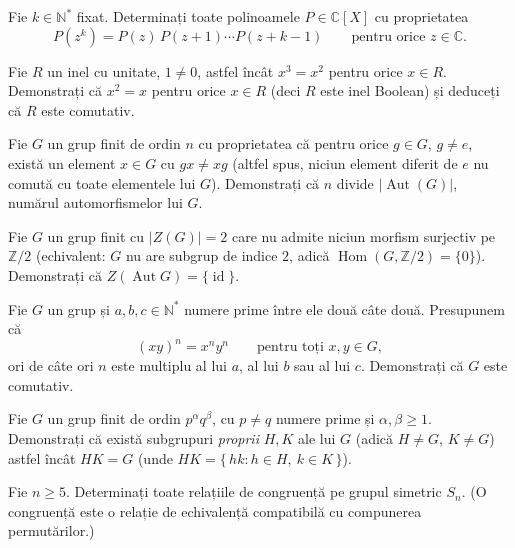 \begin{problema}
Fie $k \in \mathbb{N}^{*}$ fixat. Determinați toate polinoamele
$P \in \mathbb{C}[X]$ cu proprietatea
\[
  P(z^{k}) = P(z)\,P(z+1)\cdots P(z+k-1) \qquad \text{pentru orice } z \in \mathbb{C}.
\]
\end{problema}

\begin{problema}
Fie $R$ un inel cu unitate, $1\neq 0$, astfel încât $x^{3}=x^{2}$
pentru orice $x\in R$. Demonstrați că $x^{2}=x$ pentru orice
$x\in R$ (deci $R$ este inel Boolean) și deduceți că $R$ este
comutativ.
\end{problema}

\begin{problema}
Fie $G$ un grup finit de ordin $n$ cu proprietatea că pentru orice
$g\in G$, $g\neq e$, există un element $x\in G$ cu $gx\neq xg$ (altfel
spus, niciun element diferit de $e$ nu comută cu toate elementele lui
$G$). Demonstrați că $n$ divide $|\operatorname{Aut}(G)|$,
numărul automorfismelor lui $G$.
\end{problema}

\begin{problema}
Fie $G$ un grup finit cu $|Z(G)|=2$ care nu admite niciun morfism surjectiv
pe $\mathbb{Z}/2$ (echivalent: $G$ nu are subgrup de indice $2$, adică
$\operatorname{Hom}(G,\mathbb{Z}/2)=\{0\}$). Demonstrați că
$Z(\operatorname{Aut}G)=\{\operatorname{id}\}$.
\end{problema}

\begin{problema}
Fie $G$ un grup și $a,b,c\in\mathbb{N}^{*}$ numere prime între ele
două câte două. Presupunem că
\[
  (xy)^{n}=x^{n}y^{n}\qquad\text{pentru toți } x,y\in G,
\]
ori de câte ori $n$ este multiplu al lui $a$, al lui $b$ sau al lui $c$.
Demonstrați că $G$ este comutativ.
\end{problema}

\begin{problema}
Fie $G$ un grup finit de ordin $p^{\alpha}q^{\beta}$, cu $p\neq q$ numere
prime și $\alpha,\beta\ge 1$. Demonstrați că există
subgrupuri \emph{proprii} $H,K$ ale lui $G$ (adică $H\neq G$, $K\neq G$) astfel încât $HK=G$ (unde
$HK=\{\,hk : h\in H,\ k\in K\,\}$).
\end{problema}

\begin{problema}
Fie $n\ge 5$. Determinați toate relațiile de congruență pe
grupul simetric $S_{n}$. (O congruență este o relație de
echivalență compatibilă cu compunerea permutărilor.)
\end{problema}

